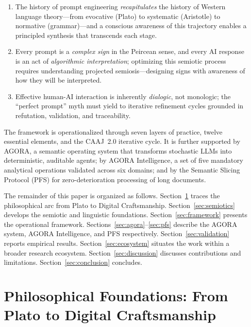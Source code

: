 \documentclass[11pt,a4paper]{article}
\begin{document}
\begin{enumerate}[label=(\roman*)]
    \item The history of prompt engineering \emph{recapitulates} the history of Western language theory---from evocative (Plato) to systematic (Aristotle) to normative (grammar)---and a conscious awareness of this trajectory enables a principled synthesis that transcends each stage.
    \item Every prompt is a \emph{complex sign} in the Peircean sense, and every AI response is an act of \emph{algorithmic interpretation}; optimizing this semiotic process requires understanding projected semiosis---designing signs with awareness of how they will be interpreted.
    \item Effective human-AI interaction is inherently \emph{dialogic}, not monologic; the ``perfect prompt'' myth must yield to iterative refinement cycles grounded in refutation, validation, and traceability.
\end{enumerate}

The framework is operationalized through seven layers of practice, twelve essential elements, and the CAAJ~2.0 iterative cycle. It is further supported by AGORA, a semantic operating system that transforms stochastic LLMs into deterministic, auditable agents; by AGORA Intelligence, a set of five mandatory analytical operations validated across six domains; and by the Semantic Slicing Protocol (PFS) for zero-deterioration processing of long documents.

The remainder of this paper is organized as follows. Section~\ref{sec:philosophy} traces the philosophical arc from Plato to Digital Craftsmanship. Section~\ref{sec:semiotics} develops the semiotic and linguistic foundations. Section~\ref{sec:framework} presents the operational framework. Sections~\ref{sec:agora}--\ref{sec:pfs} describe the AGORA system, AGORA Intelligence, and PFS respectively. Section~\ref{sec:validation} reports empirical results. Section~\ref{sec:ecosystem} situates the work within a broader research ecosystem. Section~\ref{sec:discussion} discusses contributions and limitations. Section~\ref{sec:conclusion} concludes.

\section{Philosophical Foundations: From Plato to Digital Craftsmanship}
\label{sec:philosophy}
\end{document}
